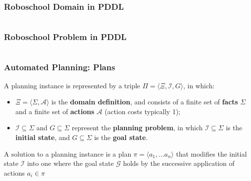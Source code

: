 \documentclass{beamer}
\begin{document}
	\begin{frame}[t]\frametitle{Roboschool Domain in PDDL}
		\begin{columns}
			\begin{column}[t]{0.5\textwidth}
			
			\end{column}
			\begin{column}[t]{0.5\textwidth}
			
			\end{column}
		\end{columns}
	\end{frame}
	
	\begin{frame}[t]\frametitle{Roboschool Problem in PDDL}
		\begin{columns}
			\begin{column}[t]{0.5\textwidth}
			
			\end{column}
			\begin{column}[t]{0.5\textwidth}
			
			\end{column}
		\end{columns}
	\end{frame}
	
	\begin{frame}[c]\frametitle{Automated Planning: Plans}
		\begin{definition} 
			A planning instance is represented by a triple $\Pi = \langle \Xi, \mathcal{I}, G\rangle$, in which:
			\begin{itemize}
				\item $\Xi = \langle \Sigma, \mathcal{A} \rangle$ is the \textbf{domain definition}, and consists of a finite set of \textbf{facts} $\Sigma$ and a finite set of \textbf{actions} $\mathcal{A}$ (action costs typically 1);
				\item $\mathcal{I} \subseteq \Sigma$ and $G \subseteq \Sigma$ represent the \textbf{planning problem}, in which $\mathcal{I} \subseteq \Sigma$ is the \textbf{initial state}, and $G \subseteq \Sigma$ is the \textbf{goal state}.
			\end{itemize}
		\end{definition}
		A solution to a planning instance is a plan $\pi = \langle a_1, \dots a_n\rangle$ that modifies the initial state $\mathcal{I}$ into one where the goal state $\mathcal{G}$ holds by the successive application of actions $a_i \in \pi$
	\end{frame}
	
\end{document}
